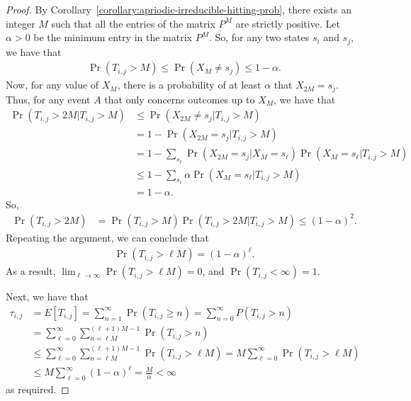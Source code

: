 \documentclass[10pt]{article}
\begin{document}
\begin{itemize}
  \begin{proof}
    By Corollary~\ref{corollary:apriodic-irreducible-hitting-prob}, there exists an integer $M$ such that all the entries of the matrix $P^M$ are strictly positive. Let $\alpha > 0$ be the minimum entry in the matrix $P^M$. So, for any two states $s_i$ and $s_j$, we have that
    \begin{align*}
        \Pr(T_{i,j} > M) \leq \Pr(X_M \neq s_j) \leq 1 - \alpha.
    \end{align*}
    Now, for any value of $X_M$, there is a probability of at least $\alpha$ that $X_{2M} = s_j$. Thus, for any event $A$ that only concerns outcomes up to $X_M$, we have that
    \begin{align*}
        \Pr(T_{i,j} > 2M | T_{i,j} > M)
        &\leq \Pr(X_{2M} \neq s_j | T_{i,j} > M) \\
        &= 1 - \Pr(X_{2M} = s_j | T_{i,j} > M) \\
        &= 1 - \sum_{s_\ell} \Pr(X_{2M} = s_j|X_M=s_\ell) \Pr(X_M = s_\ell| T_{i,j} > M) \\
        &\leq 1 - \sum_{s_\ell} \alpha \Pr(X_M = s_\ell| T_{i,j} > M) \\
        &= 1 - \alpha. 
    \end{align*}
    So,
    \begin{align*}
        \Pr(T_{i,j} > 2M) 
        &= \Pr(T_{i,j} > M)\Pr(T_{i,j} > 2M|T_{i,j}>M) 
        \leq (1 - \alpha)^2.
    \end{align*}
    Repeating the argument, we can conclude that
    \begin{align*}
        \Pr(T_{i,j} > \ell M) = (1 - \alpha)^\ell.
    \end{align*}
    As a result, $\lim_{\ell \rightarrow \infty} \Pr(T_{i,j} > \ell M) = 0$, and $\Pr(T_{i,j} < \infty) = 1$.


    Next, we have that
    \begin{align*}
        \tau_{i,j} &= E[T_{i,j}] = \sum_{n=1}^\infty \Pr(T_{i,j} \geq n) = \sum_{n=0}^\infty P(T_{i,j} > n) \\
        &= \sum_{\ell = 0}^\infty \sum_{n = \ell M}^{(\ell+1)M-1} \Pr(T_{i,j} > n) \\
        &\leq \sum_{\ell = 0}^\infty \sum_{n = \ell M}^{(\ell+1)M-1} \Pr(T_{i,j} > \ell M) 
        = M \sum_{\ell = 0}^\infty \Pr(T_{i,j} > \ell M) \\
        &\leq M \sum_{\ell = 0}^\infty (1-\alpha)^\ell = \frac{M}{\alpha} < \infty
    \end{align*}
    as required.
  \end{proof}
\end{itemize}
\end{document}
